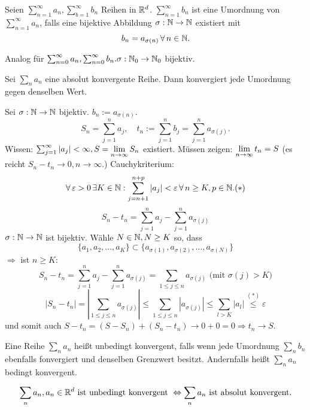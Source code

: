 \documentclass[../ana1.tex]{subfiles}
\begin{document}
\begin{defi}[Umordnung]
    Seien \( \sum_{n=1}^\infty a_n, \sum_{b=1}^\infty b_n \) Reihen in \( \mathbb{R}^d \). \( \sum_{n=1}^\infty b_n \) ist eine Umordnung von \( \sum_{n=1}^\infty a_n \), falls eine bijektive Abbildung \( \sigma:\mathbb{N}\rightarrow\mathbb{N} \) existiert mit
    \[ b_n = a_{\sigma(n)} \,\forall \, n\in\mathbb{N}. \]
\end{defi}
\begin{bem}
    Analog für \( \sum_{n=0}^\infty a_n, \sum_{n=0}^\infty b_n. \sigma: \mathbb{N}_0 \rightarrow \mathbb{N}_0 \) bijektiv.
\end{bem}
\begin{satz}[Umordnungssatz]
    Sei \( \sum_n a_n \) eine absolut konvergente Reihe. Dann konvergiert jede Umordnung gegen denselben Wert.
\end{satz}
\begin{bew}
    Sei \( \sigma : \mathbb{N}\rightarrow\mathbb{N} \) bijektiv. \( b_n := a_{\sigma(n)} \).
    \[ S_n = \sum_{j=1}^n a_j, \quad t_n := \sum_{j=1}^n b_j = \sum_{j=1}^n a_{\sigma(j)}. \]
    Wissen: \( \sum_{j=1}^\infty |a_j| < \infty, S = \lim\limits_{n\rightarrow\infty} S_n \) existiert.
    Müssen zeigen: \( \lim\limits_{n\rightarrow\infty} t_n = S \) (es reicht \( S_n - t_n \rightarrow 0, n\rightarrow\infty \).)
    Cauchykriterium: 
    \[ \forall \, \varepsilon > 0 \, \exists K\in\mathbb{N}: \sum_{j=n+1}^{n+p} |a_j| < \varepsilon \,\forall \, n\geq K, p\in\mathbb{N}. (*) \]
    \[ S_n - t_n = \sum_{j=1}^n a_j - \sum_{j=1}^n a_{\sigma(j)} \]
    \( \sigma : \mathbb{N}\rightarrow\mathbb{N} \) ist bijektiv. Wähle \( N\in\mathbb{N}, N\geq K \) so, dass
    \[ \{ a_1, a_2, \ldots, a_K \} \subset \{ a_{\sigma(1)}, a_{\sigma(2)}, \ldots, a_{\sigma(N)} \} \]
    \( \Rightarrow \) ist \( n\geq K \):
    \[ S_n - t_n = \sum_{j=1}^n a_j - \sum_{j=1}^n a_{\sigma(j)} = \sum_{1\leq j \leq n} a_{\sigma(j)} \text{ (mit } \sigma(j) > K\text{)} \]
    \[ |S_n - t_n| = \left| \sum_{1\leq j \leq n} a_{\sigma(j)} \right| \leq \sum_{1\leq j \leq n} | a_{\sigma(j)} | \leq \sum_{l>K} |a_l| \overset{(*)}{\leq}\varepsilon \]
    und somit auch \( S - t_n = (S-S_n) + (S_n - t_n) \rightarrow 0 + 0 = 0 \Rightarrow t_n \rightarrow S \).
\end{bew}
\begin{bem}
    Eine Reihe \( \sum_n a_n \) heißt unbedingt konvergent, falls wenn jede Umordnung \( \sum_n b_n \) ebenfalls fonvergiert und denselben Grenzwert besitzt. Andernfalls heißt \( \sum_n a_n \) bedingt konvergent.
\end{bem}
\begin{satz}[Dirichlet 1837]%
    \[ \sum_n a_n, a_n \in\mathbb{R}^d \text{ ist unbedingt konvergent } \Leftrightarrow \sum_n a_n \text{ ist absolut konvergent.} \]
\end{satz}
\end{document}
